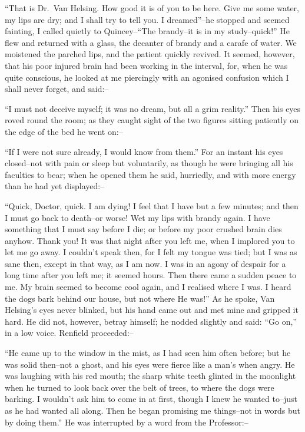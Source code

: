 \documentclass[12pt,openright]{book}
\begin{document}
“That is Dr. Van Helsing. How good it is of you to be here. Give me some water, my lips are dry; and I shall try to tell you. I dreamed”–he stopped and seemed fainting, I called quietly to Quincey–“The brandy–it is in my study–quick!” He flew and returned with a glass, the decanter of brandy and a carafe of water. We moistened the parched lips, and the patient quickly revived. It seemed, however, that his poor injured brain had been working in the interval, for, when he was quite conscious, he looked at me piercingly with an agonised confusion which I shall never forget, and said:–

“I must not deceive myself; it was no dream, but all a grim reality.” Then his eyes roved round the room; as they caught sight of the two figures sitting patiently on the edge of the bed he went on:–

“If I were not sure already, I would know from them.” For an instant his eyes closed–not with pain or sleep but voluntarily, as though he were bringing all his faculties to bear; when he opened them he said, hurriedly, and with more energy than he had yet displayed:–

“Quick, Doctor, quick. I am dying! I feel that I have but a few minutes; and then I must go back to death–or worse! Wet my lips with brandy again. I have something that I must say before I die; or before my poor crushed brain dies anyhow. Thank you! It was that night after you left me, when I implored you to let me go away. I couldn’t speak then, for I felt my tongue was tied; but I was as sane then, except in that way, as I am now. I was in an agony of despair for a long time after you left me; it seemed hours. Then there came a sudden peace to me. My brain seemed to become cool again, and I realised where I was. I heard the dogs bark behind our house, but not where He was!” As he spoke, Van Helsing’s eyes never blinked, but his hand came out and met mine and gripped it hard. He did not, however, betray himself; he nodded slightly and said: “Go on,” in a low voice. Renfield proceeded:–

“He came up to the window in the mist, as I had seen him often before; but he was solid then–not a ghost, and his eyes were fierce like a man’s when angry. He was laughing with his red mouth; the sharp white teeth glinted in the moonlight when he turned to look back over the belt of trees, to where the dogs were barking. I wouldn’t ask him to come in at first, though I knew he wanted to–just as he had wanted all along. Then he began promising me things–not in words but by doing them.” He was interrupted by a word from the Professor:–
\end{document}
